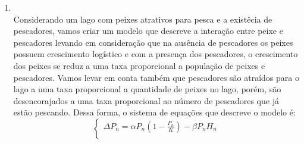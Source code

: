 \documentclass[a4paper]{article}
\begin{document}
\begin{enumerate}
$K$ \'e a capacidade de suporte do meio;\\
$M$ \'e a quantidade de indiv\'iduos que morrem por causas naturais (velhice, doen\c{c}a, cat\'astrofes, etc.).\\
\\
Os coeficientes $\alpha_1, \beta_1, \gamma_1$ representam a taxa de natalidade da esp\'ecie.\\
O efeito produzido pelo aparecimento de uma outra esp\'ecie, competi\c{c}\~ao inter-espec\'ifica, \'e proporcional ao produto dos termos das esp\'ecies multiplicado pelo fator de decrescimento da esp\'ecia presa. Neste modelo, estou supondo que o decrescimento ($\alpha_2, \beta_2, \gamma_2 $) n\~ao muda mesmo mudando a esp\'ecie predadora.\\
O coeficiente $\frac{P ^2}{K}$, onde $P$ \'e uma popula\c{c}\~ao qualquer, mede o efeito do crescimento de uma popula\c{c}\~ao pelo acr\'escimo de um novo indiv\'iduo.\\
Uma observa\c{c}\~ao relevante para a simula\c{c}\~ao do modelo \'e o valor dado aos coeficientes $\alpha$, $\beta$ e $\gamma$, pois cada esp\'ecie pode ter a capacidade de excluir a outra.\\
No caso de n\~ao existirem predadores, as presas crescem at\'e se estabilizarem devido a capacidade de suporte.\\
A popula\c{c}\~ao dos predadores diminuem na aus\^encia de presas.\\
\item
\\
Considerando um lago com peixes atrativos para pesca e a exist\^ecia de pescadores, vamos criar um modelo que descreve a intera\c{c}\~ao entre peixe e pescadores levando em considera\c{c}\~ao que na aus\^encia de pescadores os peixes possuem crescimento log\'istico e com a presen\c{c}a dos pescadores, o crescimento dos peixes se reduz a uma taxa proporcional a popula\c{c}\~ao de peixes e pescadores. Vamos levar em conta tamb\'em que pescadores s\~ao atra\'idos para o lago a uma taxa proporcional a quantidade de peixes no lago, por\'em, s\~ao desencorajados a uma taxa proporcional ao n\'umero de pescadores  que j\'a est\~ao pescando. Dessa forma, o sistema de equa\c{c}\~oes que descreve o modelo \'e:
\begin{equation}
\left\{\begin{array}{l}
\Delta P_n = \alpha P_n (1 - \frac{ P_n}{K})  - \beta P_n H_n\\

\end{array}
\end{equation}
\end{enumerate}
\end{document}
